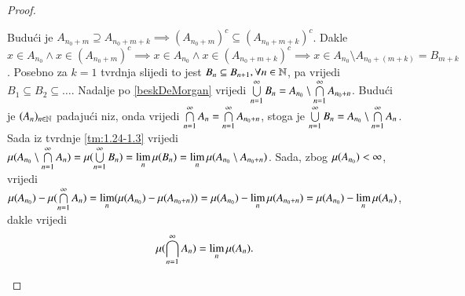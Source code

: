 \begin{proof}
\begin{enumerate}[label={(\roman*)}]
            Budu\' ci je $A_{n_0+m} \supseteq A_{n_0+m+k} \implies (A_{n_0+m})^c
            \subseteq (A_{n_0+m+k})^c$.
            Dakle $x \in A_{n_0} \land x \in (A_{n_0+m})^c \implies x \in A_{n_0}
            \land x \in (A_{n_0+m+k})^c \implies x \in A_{n_0} \setminus A_{n_0+(m+k)}
            = B_{m+k}$.
            Posebno za $k=1$ tvrdnja slijedi to jest $B_n \subseteq B_{n+1},
            \forall n \in \mathbb{N}$, pa vrijedi $B_1 \subseteq B_2 \subseteq \dots$.
            Nadalje po \eqref{beskDeMorgan} vrijedi $\bigcup\limits_{n=1}^{\infty}
            B_n = A_{n_0} \setminus \bigcap\limits_{n=1}^{\infty} A_{n_0+n}$.
            Budu\' ci je $(A_n)_{n \in \mathbb{N}}$ padaju\' ci niz, onda vrijedi
            $\bigcap\limits_{n=1}^{\infty} A_n = \bigcap\limits_{n=1}^{\infty} A_{n_0+n}$, stoga je
            $\bigcup\limits_{n=1}^{\infty} B_n = A_{n_0} \setminus \bigcap\limits_{n=1}^{\infty} A_n$.
            Sada iz tvrdnje \ref{tm:1.24-1.3} vrijedi $\mu({A_{n_0} \setminus
            \bigcap\limits_{n=1}^{\infty} A_n}) = \mu({\bigcup\limits_{n=1}^{\infty} B_n})
            = \lim\limits_{n} \mu({B_n}) = \lim\limits_{n} \mu({A_{n_0} \setminus
            A_{n_0+n}})$.
            Sada, zbog $\mu({A_{n_0}}) < \infty$, vrijedi $\mu({A_{n_0}})
            - \mu({\bigcap\limits_{n=1}^{\infty} A_n}) = \lim\limits_{n}
            (\mu({A_{n_0}}) - \mu({A_{n_0+n}})) = \mu({A_{n_0}})
            - \lim\limits_{n} \mu({A_{n_0+n}}) = \mu({A_{n_0}}) - \lim\limits_{n}
            \mu({A_n})$, dakle vrijedi
            \begin{equation*}
                \mu({\bigcap\limits_{n=1}^{\infty} A_n}) = \lim\limits_{n} \mu({A_n}).
            \end{equation*}
    \end{enumerate}
\end{proof}